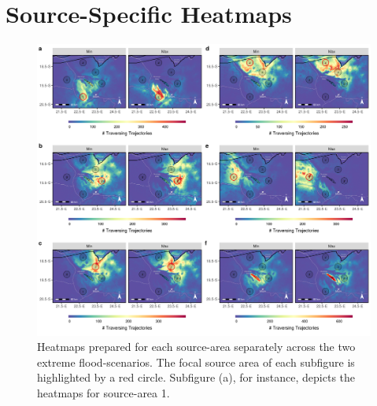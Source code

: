 \documentclass[abstract=on,10pt,a4paper,bibliography=totocnumbered]{article}
\begin{document}
\newpage
\section{Source-Specific Heatmaps}
\begin{figure}[htbp]
  \begin{center}
  \includegraphics[width = \textwidth]{99_HeatmapsIndividual.png}
  \caption{Heatmaps prepared for each source-area separately across the two
  extreme flood-scenarios. The focal source area of each subfigure is
  highlighted by a red circle. Subfigure (a), for instance, depicts the heatmaps
  for source-area 1.}
  \label{Heatmaps}
  \end{center}
\end{figure}

\newpage
\end{document}
